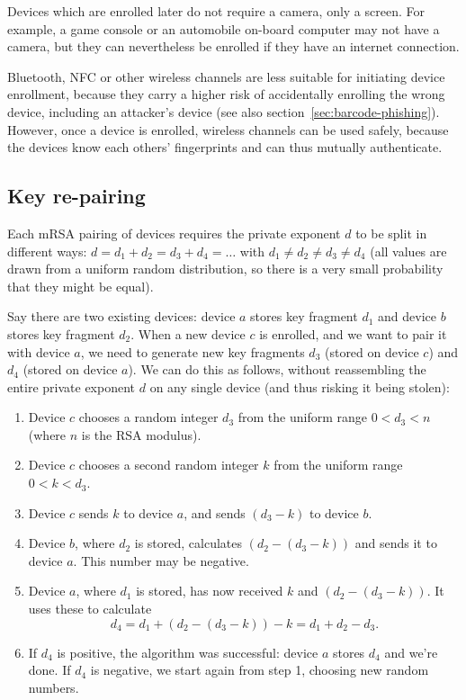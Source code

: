 Devices which are enrolled later do not require a camera, only a screen. For example, a game console
or an automobile on-board computer may not have a camera, but they can nevertheless be enrolled if
they have an internet connection.

Bluetooth, NFC or other wireless channels are less suitable for initiating device enrollment,
because they carry a higher risk of accidentally enrolling the wrong device, including an attacker's
device (see also section~\ref{sec:barcode-phishing}). However, once a device is enrolled, wireless
channels can be used safely, because the devices know each others' fingerprints and can thus
mutually authenticate.

\subsection{Key re-pairing}\label{sec:pairing}

Each mRSA pairing of devices requires the private exponent $d$ to be split in different ways:
$d = d_1 + d_2 = d_3 + d_4 = \dots$ with $d_1 \neq d_2 \neq d_3 \neq d_4$ (all values are drawn from
a uniform random distribution, so there is a very small probability that they might be equal).

Say there are two existing devices: device $a$ stores key fragment $d_1$ and device $b$ stores key
fragment $d_2$. When a new device $c$ is enrolled, and we want to pair it with device $a$, we need
to generate new key fragments $d_3$ (stored on device $c$) and $d_4$ (stored on device $a$). We can
do this as follows, without reassembling the entire private exponent $d$ on any single device (and
thus risking it being stolen):

\begin{enumerate}
\item Device $c$ chooses a random integer $d_3$ from the uniform range $0 < d_3 < n$ (where $n$ is
the RSA modulus).
\item Device $c$ chooses a second random integer $k$ from the uniform range $0 < k < d_3$.
\item Device $c$ sends $k$ to device $a$, and sends $(d_3 - k)$ to device $b$.
\item Device $b$, where $d_2$ is stored, calculates $(d_2 - (d_3 - k))$ and sends it to device $a$.
This number may be negative.
\item Device $a$, where $d_1$ is stored, has now received $k$ and $(d_2 - (d_3 - k))$. It uses these
to calculate $$d_4 = d_1 + (d_2 - (d_3 - k)) - k = d_1 + d_2 - d_3.$$
\item If $d_4$ is positive, the algorithm was successful: device $a$ stores $d_4$ and we're done. If
$d_4$ is negative, we start again from step 1, choosing new random numbers.
\end{enumerate}

